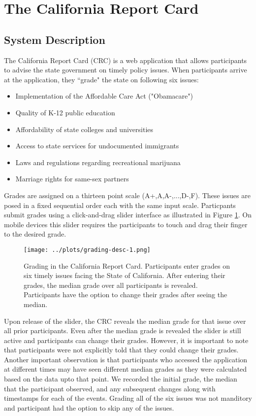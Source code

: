 \section{The California Report Card}
\subsection{System Description}
The California Report Card (CRC) is a web application that allows participants to advise the state government on timely policy issues.
When participants arrive at the application, they ``grade" the state on following six issues:
\begin{itemize}
\item Implementation of the Affordable Care Act ("Obamacare")
\item Quality of K-12 public education
\item Affordability of state colleges and universities
\item Access to state services for undocumented immigrants
\item Laws and regulations regarding recreational marijuana
\item Marriage rights for same-sex partners
\end{itemize}
Grades are assigned on a thirteen point scale (A+,A,A-,...,D-,F).
These issues are posed in a fixed sequential order each with the same input scale.
Particpants submit grades using a click-and-drag slider interface as illustrated in Figure \ref{grading-1}.
On mobile devices this slider requires the participants to touch and drag their finger to the desired grade.

\begin{figure}[h]
  \centering
    \texttt{[image: ../plots/grading-desc-1.png]}
      \caption{Grading in the California Report Card. Participants enter grades on six timely issues facing the State of California. After entering their grades, the median grade over all participants is revealed. Participants have the option to change their grades after seeing the median.}
      \label{grading-1}
\end{figure}

Upon release of the slider, the CRC reveals the median grade for that issue over all prior participants.
Even after the median grade is revealed the slider is still active and participants can change their grades.
However, it is important to note that participants were not explicitly told that they could change their grades.
Another important observation is that participants who accessed the application at different times may have seen different median grades as they were calculated based on the data upto that point.
We recorded the initial grade, the median that the participant observed, and any subsequent changes along with timestamps for each of the events. 
Grading all of the six issues was not manditory and participant had the option to skip any of the issues.

